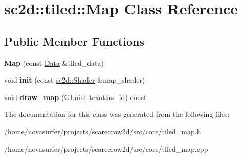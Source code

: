 \hypertarget{classsc2d_1_1tiled_1_1Map}{}\section{sc2d\+:\+:tiled\+:\+:Map Class Reference}
\label{classsc2d_1_1tiled_1_1Map}
\subsection*{Public Member Functions}
\begin{DoxyCompactItemize}
\item 
\mbox{\label{classsc2d_1_1tiled_1_1Map_ab9eba13eef207d590c0d472cc4b31914}} 
{\bfseries Map} (const \hyperlink{structsc2d_1_1tiled_1_1Data}{Data} \&tiled\+\_\+data)
\item 
\mbox{\label{classsc2d_1_1tiled_1_1Map_a5a477ef9a53dacf9335ac3701799dac5}} 
void {\bfseries init} (const \hyperlink{classsc2d_1_1Shader}{sc2d\+::\+Shader} \&map\+\_\+shader)
\item 
\mbox{\label{classsc2d_1_1tiled_1_1Map_ab4d594dac29fb48040bc1dde24657110}} 
void {\bfseries draw\+\_\+map} (G\+Luint texatlas\+\_\+id) const
\end{DoxyCompactItemize}


The documentation for this class was generated from the following files\+:\begin{DoxyCompactItemize}
\item 
/home/novasurfer/projects/scarecrow2d/src/core/tiled\+\_\+map.\+h\item 
/home/novasurfer/projects/scarecrow2d/src/core/tiled\+\_\+map.\+cpp\end{DoxyCompactItemize}
